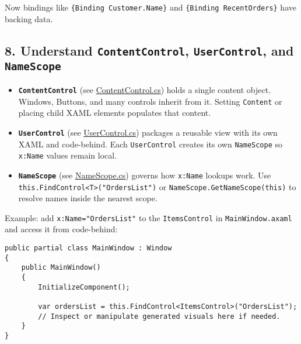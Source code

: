 Now bindings like \passthrough{\lstinline!\{Binding Customer.Name\}!}
and \passthrough{\lstinline!\{Binding RecentOrders\}!} have backing
data.

\subsection{\texorpdfstring{8. Understand \texttt{ContentControl},
\texttt{UserControl}, and
\texttt{NameScope}}{8. Understand ContentControl, UserControl, and NameScope}}\label{understand-contentcontrol-usercontrol-and-namescope}

\begin{itemize}
\tightlist
\item
  \textbf{\passthrough{\lstinline!ContentControl!}} (see
  \href{https://github.com/AvaloniaUI/Avalonia/blob/master/src/Avalonia.Controls/ContentControl.cs}{ContentControl.cs})
  holds a single content object. Windows, Buttons, and many controls
  inherit from it. Setting \passthrough{\lstinline!Content!} or placing
  child XAML elements populates that content.
\item
  \textbf{\passthrough{\lstinline!UserControl!}} (see
  \href{https://github.com/AvaloniaUI/Avalonia/blob/master/src/Avalonia.Controls/UserControl.cs}{UserControl.cs})
  packages a reusable view with its own XAML and code-behind. Each
  \passthrough{\lstinline!UserControl!} creates its own
  \passthrough{\lstinline!NameScope!} so
  \passthrough{\lstinline!x:Name!} values remain local.
\item
  \textbf{\passthrough{\lstinline!NameScope!}} (see
  \href{https://github.com/AvaloniaUI/Avalonia/blob/master/src/Avalonia.Base/Styling/NameScope.cs}{NameScope.cs})
  governs how \passthrough{\lstinline!x:Name!} lookups work. Use
  \passthrough{\lstinline!this.FindControl<T>("OrdersList")!} or
  \passthrough{\lstinline!NameScope.GetNameScope(this)!} to resolve
  names inside the nearest scope.
\end{itemize}

Example: add \passthrough{\lstinline!x:Name="OrdersList"!} to the
\passthrough{\lstinline!ItemsControl!} in
\passthrough{\lstinline!MainWindow.axaml!} and access it from
code-behind:

\begin{lstlisting}
public partial class MainWindow : Window
{
    public MainWindow()
    {
        InitializeComponent();

        var ordersList = this.FindControl<ItemsControl>("OrdersList");
        // Inspect or manipulate generated visuals here if needed.
    }
}
\end{lstlisting}

